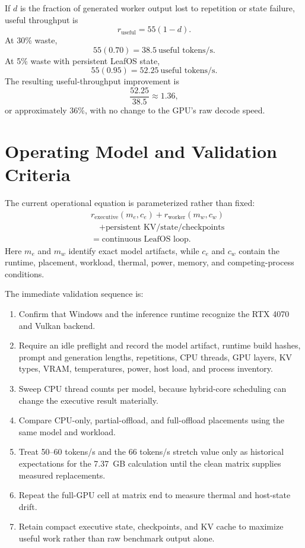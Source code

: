 \documentclass[11pt]{article}
\begin{document}
If $d$ is the fraction of generated worker output lost to repetition or state failure, useful throughput is
\[
r_{\mathrm{useful}} = 55(1-d).
\]
At 30\% waste,
\[
55(0.70)=38.5\ \text{useful tokens/s}.
\]
At 5\% waste with persistent LeafOS state,
\[
55(0.95)=52.25\ \text{useful tokens/s}.
\]
The resulting useful-throughput improvement is
\[
\frac{52.25}{38.5} \approx 1.36,
\]
or approximately 36\%, with no change to the GPU's raw decode speed.

\section{Operating Model and Validation Criteria}

The current operational equation is parameterized rather than fixed:
\[
\begin{aligned}
&r_{\mathrm{executive}}(m_e,c_e) + r_{\mathrm{worker}}(m_w,c_w) \\
&\quad + \text{persistent KV/state/checkpoints} \\
&= \text{continuous LeafOS loop}.
\end{aligned}
\]
Here $m_e$ and $m_w$ identify exact model artifacts, while $c_e$ and $c_w$ contain the runtime, placement, workload, thermal, power, memory, and competing-process conditions.

The immediate validation sequence is:
\begin{enumerate}
	\item Confirm that Windows and the inference runtime recognize the RTX 4070 and Vulkan backend.
	\item Require an idle preflight and record the model artifact, runtime build hashes, prompt and generation lengths, repetitions, CPU threads, GPU layers, KV types, VRAM, temperatures, power, host load, and process inventory.
	\item Sweep CPU thread counts per model, because hybrid-core scheduling can change the executive result materially.
	\item Compare CPU-only, partial-offload, and full-offload placements using the same model and workload.
	\item Treat 50--60 tokens/s and the 66 tokens/s stretch value only as historical expectations for the 7.37~GB calculation until the clean matrix supplies measured replacements.
	\item Repeat the full-GPU cell at matrix end to measure thermal and host-state drift.
	\item Retain compact executive state, checkpoints, and KV cache to maximize useful work rather than raw benchmark output alone.
\end{enumerate}
\end{document}
